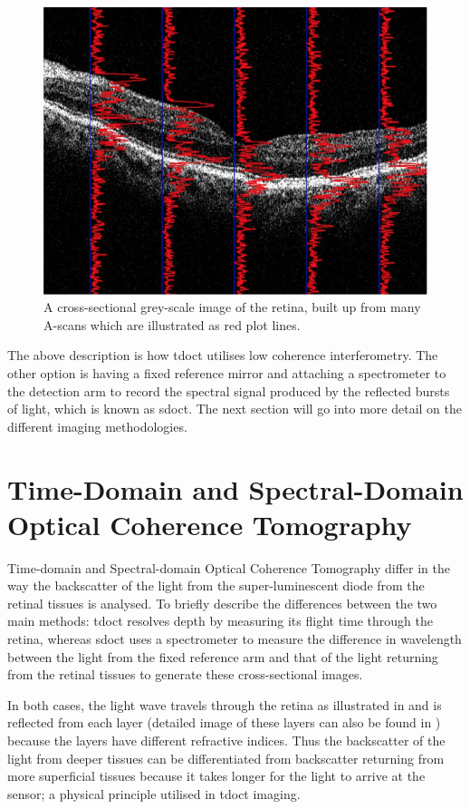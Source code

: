 \begin{figure}[H]
\centering
\includegraphics{figures/morgan_3}
\caption{A cross-sectional grey-scale image of the retina, built up from many A-scans which are illustrated as red plot lines. \cite{mbib_6} }
\label{fig:m_3}
\end{figure}

The above description is how \Gls{tdoct} utilises low coherence interferometry.
The other option is having a fixed reference mirror and attaching a spectrometer to
the detection arm to record the spectral signal produced by the reflected
bursts of light, which is known as \Gls{sdoct}.\cite{mbib_3} The next
section will go into more detail on the different imaging methodologies.

\section{Time-Domain and Spectral-Domain Optical Coherence Tomography}
Time-domain and Spectral-domain Optical Coherence Tomography differ in the way
the backscatter of the light from the super-luminescent diode from the retinal
tissues is analysed.  To briefly describe the differences between the two main
methods: \Gls{tdoct} resolves depth by measuring its flight time through the retina,
whereas \Gls{sdoct} uses a spectrometer to measure the difference in wavelength
between the light from the fixed reference arm and that of the light returning
from the retinal tissues to generate these cross-sectional images.\cite{mbib_7}

In both cases, the light wave travels through the retina as illustrated in  and
is reflected from each layer (detailed image of these layers can also be
found in ) because the layers have different refractive indices.
Thus the backscatter of the light from deeper tissues can be differentiated from
backscatter returning from more superficial tissues because it takes longer for
the light to arrive at the sensor; a physical principle utilised in \Gls{tdoct}
imaging.\cite{mbib_4}

